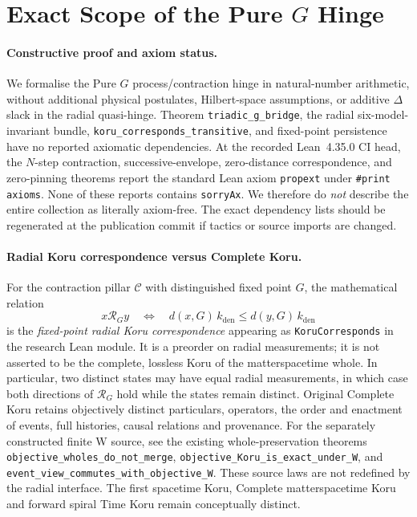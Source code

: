\section{Exact Scope of the Pure $G$ Hinge}
\label{sec:pureg-exact-scope}

\paragraph{Constructive proof and axiom status.}
We formalise the Pure $G$ process/contraction hinge in natural-number
arithmetic, without additional physical postulates, Hilbert-space
assumptions, or additive $\Delta$ slack in the radial quasi-hinge.
Theorem \texttt{triadic\_g\_bridge}, the radial six-model-invariant
bundle, \texttt{koru\_corresponds\_transitive}, and fixed-point
persistence have no reported axiomatic dependencies.  At the recorded
Lean~4.35.0 CI head, the $N$-step contraction, successive-envelope,
zero-distance correspondence, and zero-pinning theorems report the
standard Lean axiom \texttt{propext} under \texttt{\#print axioms}.
None of these reports contains \texttt{sorryAx}.  We therefore do
\emph{not} describe the entire collection as literally axiom-free.
The exact dependency lists should be regenerated at the publication
commit if tactics or source imports are changed.

\paragraph{Radial Koru correspondence versus Complete Koru.}
For the contraction pillar $\mathcal C$ with distinguished fixed point
$G$, the mathematical relation
\[
 x\mathrel{\mathcal R_G}y
 \quad\Longleftrightarrow\quad
 d(x,G)\,k_{\mathrm{den}}
 \leq d(y,G)\,k_{\mathrm{den}}
\]
is the \emph{fixed-point radial Koru correspondence} appearing as
\texttt{KoruCorresponds} in the research Lean module. It is a preorder
on radial measurements; it is not asserted to be the complete,
lossless Koru of the matterspacetime whole. In particular,
two distinct states may have equal radial measurements, in which
case both directions of $\mathcal R_G$ hold while the states remain
distinct. Original Complete Koru retains objectively distinct
particulars, operators, the order and enactment of events, full
histories, causal relations and provenance. For the separately
constructed finite W source, see the existing whole-preservation
theorems \texttt{objective\_wholes\_do\_not\_merge},
\texttt{objective\_Koru\_is\_exact\_under\_W}, and
\texttt{event\_view\_commutes\_with\_objective\_W}.
These source laws are not redefined by the radial interface.
The first spacetime Koru, Complete matterspacetime Koru and forward
spiral Time Koru remain conceptually distinct.

